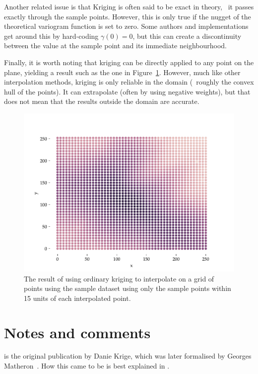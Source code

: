 Another related issue is that Kriging is often said to be exact in theory, \ie\ it passes exactly through the sample points.
However, this is only true if the nugget of the theoretical variogram function is set to zero.
Some authors and implementations get around this by hard-coding \(\gamma(0) = 0\), but this can create a discontinuity between the value at the sample point and its immediate neighbourhood.

Finally, it is worth noting that kriging can be directly applied to any point on the plane, yielding a result such as the one in Figure~\ref{fig:interpolation}.
However, much like other interpolation methods, kriging is only reliable in the domain (\ie\ roughly the convex hull of the points).
It can extrapolate (often by using negative weights), but that does not mean that the results outside the domain are accurate.

\begin{figure}[htbp]
\centering
\includegraphics[width=\linewidth]{figs/interpolation}
\caption{The result of using ordinary kriging to interpolate on a grid of points using the sample dataset using only the sample points within 15 units of each interpolated point.}%
\label{fig:interpolation}
\end{figure}

%
\section{Notes and comments}

\citet{Krige51} is the original publication by Danie Krige, which was later formalised by Georges Matheron~\citep{Matheron62,Matheron65}.
How this came to be is best explained in \citet{cressie93}.

